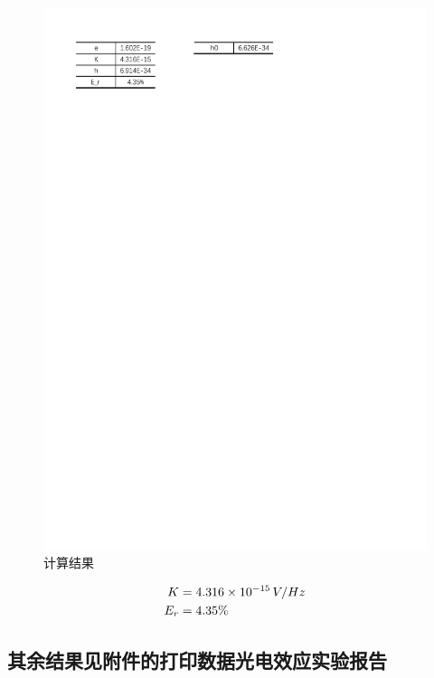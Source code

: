 \documentclass[12pt]{article}
\begin{document}
\begin{figure}[H] %
    \centering
    \includegraphics[width=\textwidth]{./figures/计算结果.pdf} 
    \caption{计算结果}
    \label{fig:table_data4}
\end{figure}

\begin{align*}
    K &= 4.316 \times 10^{-15} \, \text{$ V/Hz$} \\
    E_r &= 4.35\%
    \end{align*}


\subsection{\normalfont 其余结果见附件的打印数据光电效应实验报告}
\end{document}
